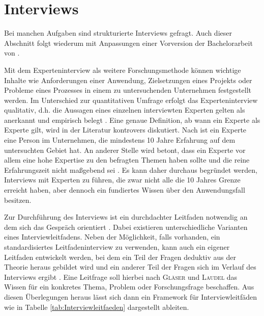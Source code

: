 \section{Interviews}
\label{sec:FM-Interviews}
%
Bei manchen Aufgaben sind strukturierte Interviews gefragt. Auch dieser Abschnitt folgt wiederum 
mit Anpassungen einer Vorversion der Bachelorarbeit von \textcite{Riedel2018}.
%

Mit dem Experteninterview als weitere Forschungsmethode können wichtige Inhalte wie
Anforderungen einer Anwendung, Zielsetzungen eines Projekts oder Probleme eines
Prozesses in einem zu untersuchenden Unternehmen festgestellt werden. Im Unterschied
zur quantitativen Umfrage erfolgt das Experteninterview qualitativ, d.h. die Aussagen
eines einzelnen interviewten Experten gelten als anerkannt und empirisch belegt
%
%
\parencites[s.][103]{Glaeser2010}{Mayring1994}.
%
Eine genaue Definition, ab wann ein Experte als
Experte gilt, wird in der Literatur kontrovers diskutiert. Nach \textcite{Mieg2006} ist
ein Experte eine Person im Unternehmen, die mindestens 10 Jahre Erfahrung auf dem
untersuchten Gebiet hat. An anderer Stelle wird betont, dass ein Experte vor allem eine
hohe Expertise zu den befragten Themen haben sollte und die reine Erfahrungszeit nicht
maßgebend sei \parencite[s.][11 -- 12]{Glaeser2010}. Es kann daher durchaus begründet werden, 
Interviews mit Experten zu führen, die zwar nicht alle die 10 Jahres Grenze erreicht haben,
aber dennoch ein fundiertes Wissen über den Anwendungsfall besitzen.

Zur Durchführung des Interviews ist ein durchdachter Leitfaden notwendig an dem sich
das Gespräch orientiert \parencite[s.][142 -- 143]{Glaeser2010}. Dabei existieren
unterschiedliche Varianten eines Interviewleitfadens. Neben der Möglichkeit, falls vorhanden,
ein standardisiertes Leitfadeninterview zu verwenden, kann auch ein eigener Leitfaden
entwickelt werden, bei dem ein Teil der Fragen deduktiv aus der Theorie
heraus gebildet wird und ein anderer Teil der Fragen sich im Verlauf des Interviews ergibt
\parencite[s.][42]{Glaeser2010}. Eine Leitfrage soll hierbei nach \textsc{Gläser} und \textsc{Laudel}
das Wissen für ein konkretes Thema, Problem oder Forschungsfrage beschaffen. Aus
diesen Überlegungen heraus lässt sich dann ein Framework für Interviewleitfäden wie in
Tabelle \ref{tab:Interviewleitfaeden} dargestellt ableiten.

